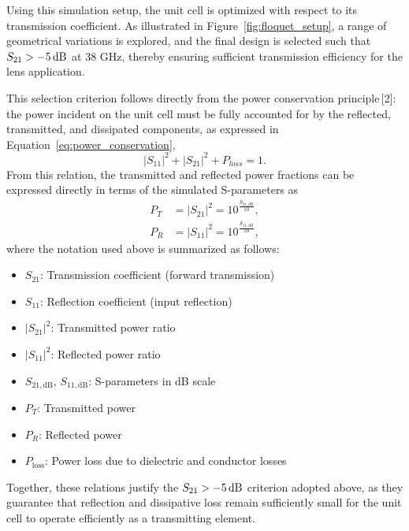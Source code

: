     Using this simulation setup, the unit cell is optimized with respect to its transmission coefficient. As illustrated in Figure~\ref{fig:floquet_setup}, a range of geometrical variations is explored, and the final design is selected such that $S_{21}>-5\text{\,dB}$ at 38 GHz, thereby ensuring sufficient transmission efficiency for the lens application.

    This selection criterion follows directly from the power conservation principle\,[2]: the power incident on the unit cell must be fully accounted for by the reflected, transmitted, and dissipated components, as expressed in Equation~\ref{eq:power_conservation},
    \begin{equation}
        \left|S_{11}\right|^{2}+\left|S_{21}\right|^{2}+P_{loss}=1.
        \label{eq:power_conservation}
    \end{equation}
    From this relation, the transmitted and reflected power fractions can be expressed directly in terms of the simulated S-parameters as
    \begin{align}
        P_{T} &= \left|S_{21}\right|^{2} = 10^{\frac{S_{21,\text{dB}}}{10}}, \\
        P_{R} &= \left|S_{11}\right|^{2} = 10^{\frac{S_{11,\text{dB}}}{10}},
        \label{eq:power_definitions}
    \end{align}
    where the notation used above is summarized as follows:
    \begin{itemize}
        \item $S_{21}$: Transmission coefficient (forward transmission)
        \item $S_{11}$: Reflection coefficient (input reflection)
        \item $\left|S_{21}\right|^{2}$: Transmitted power ratio
        \item $\left|S_{11}\right|^{2}$: Reflected power ratio
        \item $S_{21,\text{dB}}$, $S_{11,\text{dB}}$: S-parameters in dB scale
        \item $P_{T}$: Transmitted power
        \item $P_{R}$: Reflected power
        \item $P_{\text{loss}}$: Power loss due to dielectric and conductor losses
    \end{itemize}
    Together, these relations justify the $S_{21}>-5\text{\,dB}$ criterion adopted above, as they guarantee that reflection and dissipative loss remain sufficiently small for the unit cell to operate efficiently as a transmitting element.

